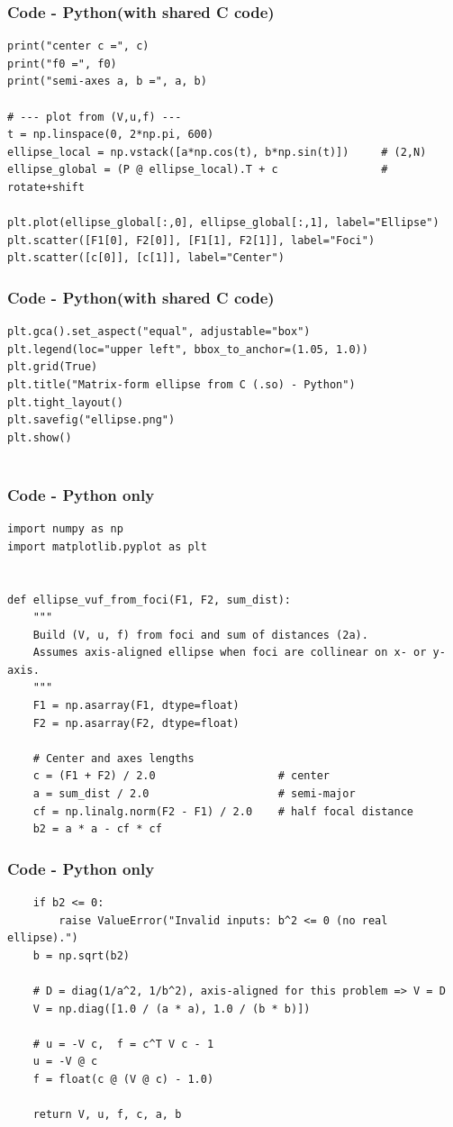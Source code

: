 \documentclass{beamer}
\theoremstyle{remark}
\numberwithin{equation}{section}
\begin{document}
\begin{frame}[fragile]
\frametitle{Code - Python(with shared C code)}
\begin{lstlisting}
print("center c =", c)
print("f0 =", f0)
print("semi-axes a, b =", a, b)

# --- plot from (V,u,f) ---
t = np.linspace(0, 2*np.pi, 600)
ellipse_local = np.vstack([a*np.cos(t), b*np.sin(t)])     # (2,N)
ellipse_global = (P @ ellipse_local).T + c                # rotate+shift

plt.plot(ellipse_global[:,0], ellipse_global[:,1], label="Ellipse")
plt.scatter([F1[0], F2[0]], [F1[1], F2[1]], label="Foci")
plt.scatter([c[0]], [c[1]], label="Center")

\end{lstlisting}
\end{frame}

\begin{frame}[fragile]
\frametitle{Code - Python(with shared C code)}
\begin{lstlisting}
plt.gca().set_aspect("equal", adjustable="box")
plt.legend(loc="upper left", bbox_to_anchor=(1.05, 1.0))
plt.grid(True)
plt.title("Matrix-form ellipse from C (.so) - Python")
plt.tight_layout()
plt.savefig("ellipse.png")
plt.show()


\end{lstlisting}
\end{frame}



\begin{frame}[fragile]
\frametitle{Code - Python only}
\begin{lstlisting}
import numpy as np
import matplotlib.pyplot as plt


def ellipse_vuf_from_foci(F1, F2, sum_dist):
    """
    Build (V, u, f) from foci and sum of distances (2a).
    Assumes axis-aligned ellipse when foci are collinear on x- or y-axis.
    """
    F1 = np.asarray(F1, dtype=float)
    F2 = np.asarray(F2, dtype=float)

    # Center and axes lengths
    c = (F1 + F2) / 2.0                   # center
    a = sum_dist / 2.0                    # semi-major
    cf = np.linalg.norm(F2 - F1) / 2.0    # half focal distance
    b2 = a * a - cf * cf

\end{lstlisting}
\end{frame}

\begin{frame}[fragile]
\frametitle{Code - Python only}
\begin{lstlisting}
    if b2 <= 0:
        raise ValueError("Invalid inputs: b^2 <= 0 (no real ellipse).")
    b = np.sqrt(b2)

    # D = diag(1/a^2, 1/b^2), axis-aligned for this problem => V = D
    V = np.diag([1.0 / (a * a), 1.0 / (b * b)])

    # u = -V c,  f = c^T V c - 1
    u = -V @ c
    f = float(c @ (V @ c) - 1.0)

    return V, u, f, c, a, b


\end{lstlisting}
\end{frame}
\end{document}
